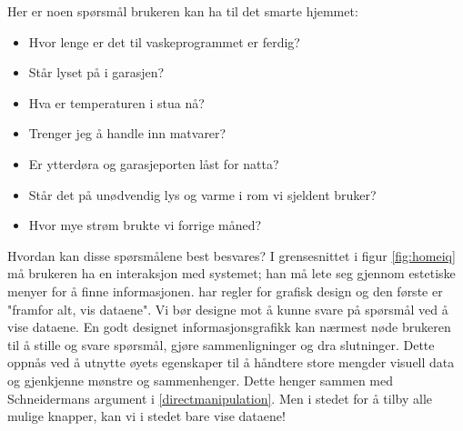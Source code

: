Her er noen spørsmål brukeren kan ha til det smarte hjemmet:
\begin{itemize}
\item Hvor lenge er det til vaskeprogrammet er ferdig?
\item Står lyset på i garasjen?
\item Hva er temperaturen i stua nå?
\item Trenger jeg å handle inn matvarer?
\item Er ytterdøra og garasjeporten låst for natta?
\item Står det på unødvendig lys og varme i rom vi sjeldent bruker?
\item Hvor mye strøm brukte vi forrige måned?
\end{itemize}
Hvordan kan disse spørsmålene best besvares? I grensesnittet i figur \ref{fig:homeiq} må brukeren ha en interaksjon med systemet; han må lete seg gjennom estetiske menyer for å finne informasjonen. \citet{tufte01} har regler for grafisk design og den første er "framfor alt, vis dataene". Vi bør designe mot å kunne svare på spørsmål ved å vise dataene. En godt designet informasjonsgrafikk kan nærmest nøde brukeren til å stille og svare spørsmål, gjøre sammenligninger og dra slutninger. Dette oppnås ved å utnytte øyets egenskaper til å håndtere store mengder visuell data og gjenkjenne mønstre og sammenhenger. Dette henger sammen med Schneidermans argument i \ref{directmanipulation}. Men i stedet for å tilby alle mulige knapper, kan vi i stedet bare vise dataene!

